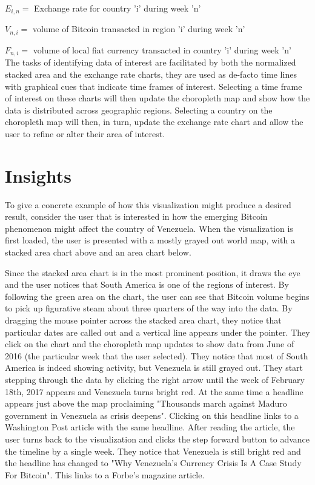 \documentclass[journal]{vgtc}                %
\begin{document}
$ E_{i,n} = $ Exchange rate for country 'i' during week 'n'

$ V_{n,i} = $ volume of Bitcoin transacted in region 'i' during week 'n'

$ F_{n,i} = $ volume of local fiat currency transacted in country 'i' during week 'n'\\

The tasks of identifying data of interest are facilitated by both the normalized stacked area and the exchange rate charts, they are used as de-facto time lines with graphical cues that indicate time frames of interest.  Selecting a time frame of interest on these charts will then update the choropleth map and show how the data is distributed across geographic regions.  Selecting a country on the choropleth map will then, in turn, update the exchange rate chart and allow the user to refine or alter their area of interest.

\section{Insights}

To give a concrete example of how this visualization might produce a desired result, consider the user that is interested in how the emerging Bitcoin phenomenon might affect the country of Venezuela.  When the visualization is first loaded, the user is presented with a mostly grayed out world map, with a stacked area chart above and an area chart below.

Since the stacked area chart is in the most prominent position, it draws the eye and the user notices that South America is one of the regions of interest.  By following the green area on the chart, the user can see that Bitcoin volume begins to pick up figurative steam about three quarters of the way into the data.  By dragging the mouse pointer across the stacked area chart, they notice that particular dates are called out and a vertical line appears under the pointer.  They click on the chart and the choropleth map updates to show data from June of 2016 (the particular week that the user selected).  They notice that most of South America is indeed showing activity, but Venezuela is still grayed out.  They start stepping through the data by clicking the right arrow until the week of February 18th, 2017 appears and Venezuela turns bright red.  At the same time a headline appears just above the map proclaiming "Thousands march against Maduro government in Venezuela as crisis deepens"\cite{sbarbarani-1}.  Clicking on this headline links to a Washington Post article with the same headline.  After reading the article, the user turns back to the visualization and clicks the step forward button to advance the timeline by a single week.  They notice that Venezuela is still bright red and the headline has changed to "Why Venezuela's Currency Crisis Is A Case Study For Bitcoin"\cite{krands-1}.  This links to a Forbe's magazine article.
\end{document}
